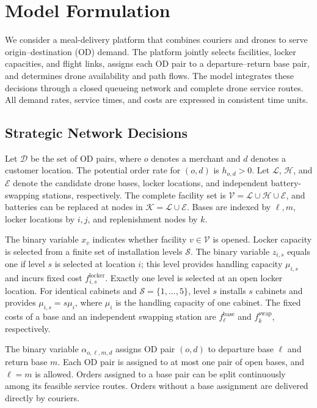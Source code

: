 \documentclass[final,3p,authoryear]{elsarticle}
\begin{document}
\color{black}


\section{Model Formulation}
\label{sec:path_model}

We consider a meal-delivery platform that combines couriers and drones to serve origin--destination (OD) demand.
The platform jointly selects facilities, locker capacities, and flight links, assigns each OD pair to a departure--return base pair, and determines drone availability and path flows.
The model integrates these decisions through a closed queueing network and complete drone service routes.
All demand rates, service times, and costs are expressed in consistent time units.

\subsection{Strategic Network Decisions}
\label{subsec:path_design}

Let $\mathcal D$ be the set of OD pairs, where $o$ denotes a merchant and $d$ denotes a customer location.
The potential order rate for $(o,d)$ is $h_{o,d}>0$.
Let $\mathcal L$, $\mathcal H$, and $\mathcal E$ denote the candidate drone bases, locker locations, and independent battery-swapping stations, respectively.
The complete facility set is $\mathcal V=\mathcal L\cup\mathcal H\cup\mathcal E$, and batteries can be replaced at nodes in $\mathcal K=\mathcal L\cup\mathcal E$.
Bases are indexed by $\ell,m$, locker locations by $i,j$, and replenishment nodes by $k$.

The binary variable $x_v$ indicates whether facility $v\in\mathcal V$ is opened.
Locker capacity is selected from a finite set of installation levels $\mathcal S$.
The binary variable $z_{i,s}$ equals one if level $s$ is selected at location $i$; this level provides handling capacity $\mu_{i,s}$ and incurs fixed cost $f_{i,s}^{\mathrm{locker}}$.
Exactly one level is selected at an open locker location.
For identical cabinets and $\mathcal S=\{1,\ldots,5\}$, level $s$ installs $s$ cabinets and provides $\mu_{i,s}=s\mu_i$, where $\mu_i$ is the handling capacity of one cabinet.
The fixed costs of a base and an independent swapping station are $f_\ell^{\mathrm{base}}$ and $f_k^{\mathrm{swap}}$, respectively.

The binary variable $\alpha_{o,\ell,m,d}$ assigns OD pair $(o,d)$ to departure base $\ell$ and return base $m$.
Each OD pair is assigned to at most one pair of open bases, and $\ell=m$ is allowed.
Orders assigned to a base pair can be split continuously among its feasible service routes.
Orders without a base assignment are delivered directly by couriers.
\end{document}
